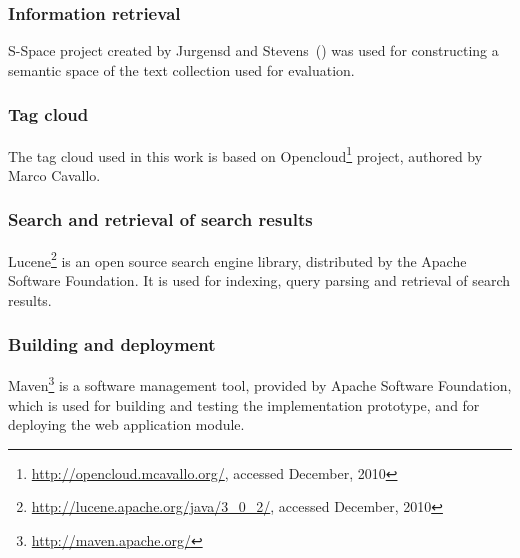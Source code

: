 \subsubsection{Information retrieval}
S-Space project created by  Jurgensd and Stevens~(\cite{S-Space}) was used for constructing a semantic space of the text collection used for evaluation. \\

\subsubsection{Tag cloud}
The tag cloud used in this work is based on Opencloud\footnote{\url{http://opencloud.mcavallo.org/}, accessed December, 2010} project, authored by Marco Cavallo.\\

\subsubsection{Search and retrieval of search results}
Lucene\footnote{\url{http://lucene.apache.org/java/3_0_2/}, accessed December, 2010} is an open source search engine library, distributed by the Apache Software Foundation. It is used for indexing, query parsing and retrieval of search results. \\

\subsubsection{Building and deployment}
Maven\footnote{\url{http://maven.apache.org/}} is a software management tool, provided by Apache Software Foundation, which is used for building and testing the implementation prototype, and for deploying the web application module.


